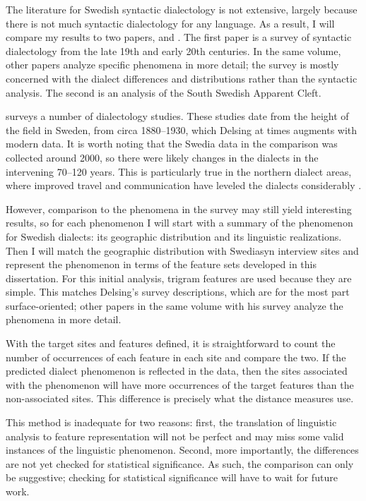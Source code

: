The literature for Swedish syntactic dialectology is not extensive,
largely because there is not much syntactic dialectology for any
language. As a result, I will compare my results to two papers,
 and . The first paper is a
survey of syntactic dialectology from the late 19th and early 20th
centuries. In the same volume, other papers analyze specific phenomena
in more detail; the survey is mostly concerned with the dialect differences
and distributions rather than the syntactic analysis. The second is an
analysis of the South Swedish Apparent Cleft.

 surveys a number of dialectology studies. These
studies date from the height of the field in Sweden, from circa
1880--1930, which Delsing at times augments with modern data. It is
worth noting that the Swedia data in the comparison was collected
around 2000, so there were likely changes in the dialects in the
intervening 70--120 years. This is particularly true in the northern
dialect areas, where improved travel and communication have
leveled the dialects considerably \cite{hallberg05}.

However, comparison to the phenomena in the survey may still yield
interesting results, so for each
phenomenon I will start with a summary of the phenomenon for Swedish
dialects: its geographic distribution and its linguistic
realizations. Then I will match the geographic distribution with
Swediasyn interview sites and represent the phenomenon in terms of the
feature sets developed in this dissertation. For this initial
analysis, trigram features are used because they are simple. This
matches Delsing's survey descriptions, which are for the most part
surface-oriented; other papers in the same volume with his survey
analyze the phenomena in more detail.

With the target sites and features defined, it is straightforward to count the
number of occurrences of each feature in each site and compare the
two. If the predicted dialect phenomenon is reflected in the data,
then the sites associated with the phenomenon will have more
occurrences of the target features than the non-associated sites. This
difference is precisely what the distance measures use.

This method is inadequate for two reasons: first, the translation of
linguistic analysis to feature representation will not be perfect and
may miss some valid instances of the linguistic phenomenon. Second,
more importantly, the differences are not yet checked for statistical
significance. As such, the comparison can only be suggestive;
checking for statistical significance will have to wait for future
work.

